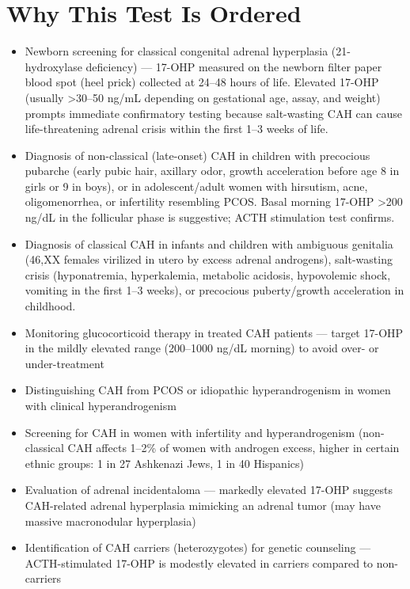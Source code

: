 \section*{Why This Test Is Ordered}
\begin{itemize}
  \item Newborn screening for classical congenital adrenal hyperplasia (21-hydroxylase deficiency) --- 17-OHP measured on the newborn filter paper blood spot (heel prick) collected at 24--48 hours of life. Elevated 17-OHP (usually >30--50 ng/mL depending on gestational age, assay, and weight) prompts immediate confirmatory testing because salt-wasting CAH can cause life-threatening adrenal crisis within the first 1--3 weeks of life.
  \item Diagnosis of non-classical (late-onset) CAH in children with precocious pubarche (early pubic hair, axillary odor, growth acceleration before age 8 in girls or 9 in boys), or in adolescent/adult women with hirsutism, acne, oligomenorrhea, or infertility resembling PCOS. Basal morning 17-OHP >200 ng/dL in the follicular phase is suggestive; ACTH stimulation test confirms.
  \item Diagnosis of classical CAH in infants and children with ambiguous genitalia (46,XX females virilized in utero by excess adrenal androgens), salt-wasting crisis (hyponatremia, hyperkalemia, metabolic acidosis, hypovolemic shock, vomiting in the first 1--3 weeks), or precocious puberty/growth acceleration in childhood.
  \item Monitoring glucocorticoid therapy in treated CAH patients --- target 17-OHP in the mildly elevated range (200--1000 ng/dL morning) to avoid over- or under-treatment
  \item Distinguishing CAH from PCOS or idiopathic hyperandrogenism in women with clinical hyperandrogenism
  \item Screening for CAH in women with infertility and hyperandrogenism (non-classical CAH affects 1--2\% of women with androgen excess, higher in certain ethnic groups: 1 in 27 Ashkenazi Jews, 1 in 40 Hispanics) \cite{new2017nonclassic}
  \item Evaluation of adrenal incidentaloma --- markedly elevated 17-OHP suggests CAH-related adrenal hyperplasia mimicking an adrenal tumor (may have massive macronodular hyperplasia)
  \item Identification of CAH carriers (heterozygotes) for genetic counseling --- ACTH-stimulated 17-OHP is modestly elevated in carriers compared to non-carriers
\end{itemize}

